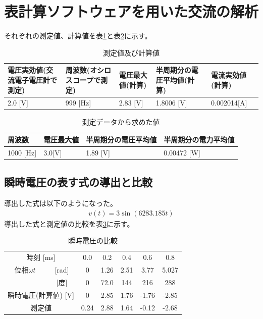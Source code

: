 \documentclass[dvipdfmx]{jsarticle}
\begin{document}
\section{表計算ソフトウェアを用いた交流の解析}
それぞれの測定値、計算値を表\ref{tb:result3}と表\ref{tb:result4}に示す。
\begin{table}[h]
  \caption{測定値及び計算値}
  \label{tb:result3}
  \begin{tabularx}{\linewidth}{|X|X|X|X|X|}\hline
    電圧実効値(交流電子電圧計で測定) & 周波数(オシロスコープで測定) & 電圧最大値(計算) & 半周期分の電圧平均値(計算) & 電流実効値(計算)\\ \hline
    2.0 [V] & 999 [Hz] & 2.83 [V] & 1.8006 [V] & 0.002014[A]\\ \hline 
  \end{tabularx}
\end{table}

\begin{table}[h]
  \caption{測定データから求めた値}
  \label{tb:result4}
  \begin{tabularx}{\linewidth}{|X|X|X|X|}\hline
    周波数 & 電圧最大値 & 半周期分の電圧平均値 & 半周期分の電力平均値\\ \hline
    1000 [Hz] & 3.0[V] & 1.89 [V] & 0.00472 [W]\\ \hline
 \end{tabularx}
\end{table}

\subsection{瞬時電圧の表す式の導出と比較}
導出した式は以下のようになった。
\begin{eqnarray}
  v(t) = 3\sin(6283.185t)
\end{eqnarray}
導出した式と測定値の比較を表\ref{tb:result5}に示す。
\begin{table}[h]
  \centering
  \caption{瞬時電圧の比較}
  \label{tb:result5}
  \begin{tabular}{|c|c|c|c|c|c|c|}\hline
    \multicolumn{2}{c}{時刻 [ms]} & 0.0 & 0.2 & 0.4 & 0.6 & 0.8\\ \cline{1-7}
    位相$\omega t$ & [rad] & 0 & 1.26 & 2.51 & 3.77 & 5.027\\ \cline{2-7}
    & [度] & 0 & 72.0 & 144 & 216 & 288\\ \hline
    \multicolumn{2}{c}{瞬時電圧(計算値) [V]} & 0 & 2.85 & 1.76 & -1.76 & -2.85\\ \hline
    \multicolumn{2}{c}{測定値} & 0.24 & 2.88 & 1.64 & -0.12 & -2.68\\ \hline
  \end{tabular}
\end{table}
\end{document}
